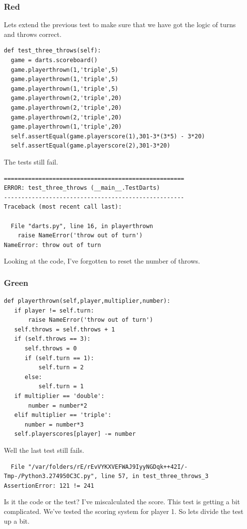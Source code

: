 \documentclass{beamer}
\begin{document}
\begin{frame}[fragile]
\frametitle{Red}
Lets extend the previous test to make sure that we have got the logic
of turns and throws correct.
\begin{lstlisting}
def test_three_throws(self):
  game = darts.scoreboard()
  game.playerthrown(1,'triple',5)
  game.playerthrown(1,'triple',5)
  game.playerthrown(1,'triple',5)
  game.playerthrown(2,'triple',20)
  game.playerthrown(2,'triple',20)
  game.playerthrown(2,'triple',20)
  game.playerthrown(1,'triple',20)
  self.assertEqual(game.playerscore(1),301-3*(3*5) - 3*20)
  self.assertEqual(game.playerscore(2),301-3*20)
\end{lstlisting}

  
\end{frame}
\begin{frame}[fragile]
The tests still fail.

\begin{verbatim}
====================================================
ERROR: test_three_throws (__main__.TestDarts)
----------------------------------------------------
Traceback (most recent call last):

  File "darts.py", line 16, in playerthrown
    raise NameError('throw out of turn')
NameError: throw out of turn
\end{verbatim}

Looking at the
code, I've forgotten to reset the number of throws.
  
\end{frame}
\begin{frame}[fragile]
\frametitle{Green}
\begin{lstlisting}
def playerthrown(self,player,multiplier,number):
   if player != self.turn:
       raise NameError('throw out of turn')
   self.throws = self.throws + 1
   if (self.throws == 3):
      self.throws = 0
      if (self.turn == 1):
          self.turn = 2
      else:
          self.turn = 1
   if multiplier == 'double':
       number = number*2
   elif multiplier == 'triple':
      number = number*3
   self.playerscores[player] -= number
\end{lstlisting}
\end{frame}
\begin{frame}[fragile]
Well the last test still fails.
\begin{verbatim}
  File "/var/folders/rE/rEvVYKXVEFWAJ9IyyNGDqk++42I/-Tmp-/Python3.274950C3C.py", line 57, in test_three_throws_3
AssertionError: 121 != 241
\end{verbatim}
Is it the code or the test? I've miscalculated the score.
This test is getting a bit complicated. We've tested the scoring
system for  player 1. So lets divide the test up a bit.
\end{frame}
\end{document}
